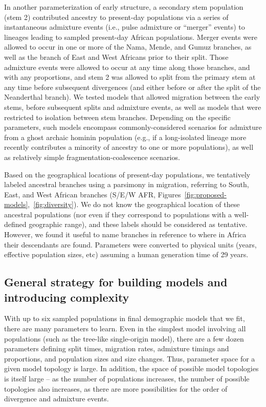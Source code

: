 \documentclass[]{article}
\begin{document}
In another parameterization of early structure, a secondary stem population
(stem 2) contributed ancestry to present-day populations via a series of
instantaneous admixture events (i.e., pulse admixture or “merger” events) to
lineages leading to sampled present-day African populations. Merger events were
allowed to occur in one or more of the Nama, Mende, and Gumuz branches, as well
as the branch of East and West Africans prior to their split. Those admixture
events were allowed to occur at any time along those branches, and with any
proportions, and stem 2 was allowed to split from the primary stem at any time
before subsequent divergences (and either before or after the split of the
Neanderthal branch). We tested models that allowed migration between the early
stems, before subsequent splits and admixture events, as well as models that
were restricted to isolation between stem branches. Depending on the specific
parameters, such models encompass commonly-considered scenarios for admixture
from a ghost archaic hominin population (e.g., if a long-isolated lineage more
recently contributes a minority of ancestry to one or more populations), as
well as relatively simple fragmentation-coalescence scenarios.

Based on the geographical locations of present-day populations, we tentatively
labeled ancestral branches using a parsimony in migration, referring to South,
East, and West African branches
(S/E/W AFR, Figures~\ref{fig:proposed-models},~\ref{fig:diversity}). We do not know the
geographical location of these ancestral populations (nor even if they
correspond to populations with a well-defined geographic range), and these
labels should be considered as tentative. However, we found it useful to name
branches in reference to where in Africa their descendants are found.
Parameters were converted to physical units
(years, effective population sizes, etc)
assuming a human generation time of 29 years.

\subsection{General strategy for building models and introducing complexity}
\label{sec:models}

With up to six sampled populations in final demographic models that we fit,
there are many parameters to learn. Even in the simplest model involving all
populations (such as the tree-like single-origin model), there are a few dozen
parameters defining split times, migration rates, admixture timings and
proportions, and population sizes and size changes. Thus, parameter space for a
given model topology is large. In addition, the space of possible model
topologies is itself large – as the number of populations increases, the number
of possible topologies also increases, as there are more possibilities for the
order of divergence and admixture events. 
\end{document}
